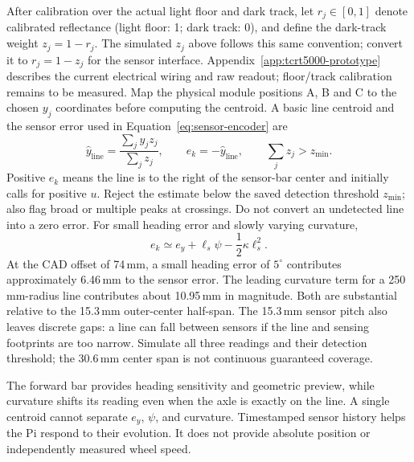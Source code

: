 After calibration over the actual light floor and dark track, let $r_j\in[0,1]$ denote calibrated reflectance (light floor: 1; dark track: 0), and define the dark-track weight $z_j=1-r_j$. The simulated $z_j$ above follows this same convention; convert it to $r_j=1-z_j$ for the sensor interface. Appendix~\ref{app:tcrt5000-prototype} describes the current electrical wiring and raw readout; floor/track calibration remains to be measured. Map the physical module positions A, B and C to the chosen $y_j$ coordinates before computing the centroid. A basic line centroid and the sensor error used in Equation~\eqref{eq:sensor-encoder} are
\begin{equation}
 \hat y_{\mathrm{line}}=\frac{\sum_j y_jz_j}{\sum_j z_j},\qquad
 e_k=-\hat y_{\mathrm{line}},\qquad \sum_j z_j>z_{\min}.
 \label{eq:sensor-centroid}
\end{equation}
Positive $e_k$ means the line is to the right of the sensor-bar center and initially calls for positive $u$. Reject the estimate below the saved detection threshold $z_{\min}$; also flag broad or multiple peaks at crossings. Do not convert an undetected line into a zero error. For small heading error and slowly varying curvature,
\begin{equation}
 e_k\simeq e_y+\ell_s\psi-\frac12\kappa\ell_s^2.
 \label{eq:sensor-preview}
\end{equation}
At the CAD offset of 74\,mm, a small heading error of $5^\circ$ contributes approximately 6.46\,mm to the sensor error. The leading curvature term for a 250\,mm-radius line contributes about 10.95\,mm in magnitude. Both are substantial relative to the 15.3\,mm outer-center half-span. The 15.3\,mm sensor pitch also leaves discrete gaps: a line can fall between sensors if the line and sensing footprints are too narrow. Simulate all three readings and their detection threshold; the 30.6\,mm center span is not continuous guaranteed coverage.

The forward bar provides heading sensitivity and geometric preview, while curvature shifts its reading even when the axle is exactly on the line. A single centroid cannot separate $e_y$, $\psi$, and curvature. Timestamped sensor history helps the Pi respond to their evolution. It does not provide absolute position or independently measured wheel speed.

